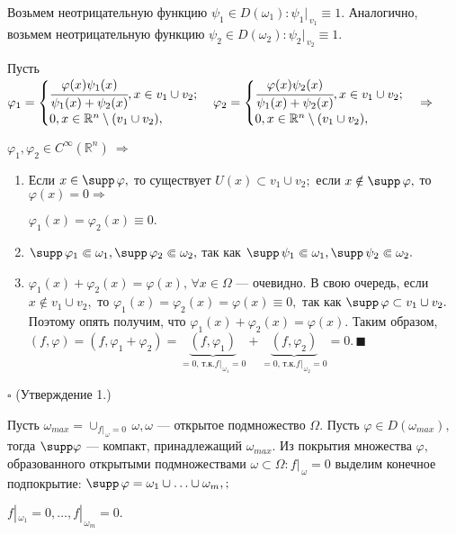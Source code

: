 \documentclass[unicode,12pt,draft]{article}
\begin{document}
Возьмем неотрицательную функцию $\psi_1\in D(\omega_1)\colon
\psi_1|_{\,v_1}\equiv1.$ Аналогично, возьмем неотрицательную
функцию $\psi_2\in D(\omega_2)\colon \psi_2|_{\,v_2}\equiv1.$

Пусть $\varphi_1=\begin{cases} \cfrac{\varphi(x)\psi_1(x)}{\psi_1(x)+\psi_2(x)}, x\in v_1\cup v_2;\\
0, x\in \mathbb R^n\setminus(v_1\cup v_2),\end{cases} \varphi_2=\begin{cases} \cfrac{\varphi(x)\psi_2(x)}{\psi_1(x)+\psi_2(x)}, x\in v_1\cup v_2;\\
0, x\in \mathbb R^n\setminus(v_1\cup v_2),\end{cases} \Rightarrow$

$\varphi_1, \varphi_2 \in C^{\infty}(\mathbb R^n)\ \Rightarrow$
\begin{enumerate}
\item Если $x\in \supp \,\varphi,$ то существует $U(x)\subset v_1\cup
v_2;$ если $x\notin \supp \,\varphi,$ то $\varphi(x)=0
\Rightarrow$

$\varphi_1(x)=\varphi_2(x)\equiv0.$
\item $\supp \,\varphi_1\Subset \omega_1, \supp \,\varphi_2\Subset
\omega_2,$ так как $\supp \,\psi_1\Subset \omega_1, \supp
\,\psi_2\Subset \omega_2.$
\item $\varphi_1(x)+\varphi_2(x)=\varphi(x),\,\forall x\in \Omega$
--- очевидно.
В свою очередь, если $x\notin v_1\cup v_2,$ то
$\varphi_1(x)=\varphi_2(x)=\varphi(x)\equiv0,$ так как $\supp
\,\varphi \subset v_1\cup v_2.$ Поэтому опять получим, что
$\varphi_1(x)+\varphi_2(x)=\varphi(x).$ Таким
образом,$(f,\varphi)=(f,\varphi_1+\varphi_2)=\underbrace{(f,\varphi_1)}_{=0,\,\mbox{т.к.}
 f|_{\,\omega_1}=0}+\underbrace{(f,\varphi_2)}_{=0,\,\mbox{т.к.}
 f|_{\,\omega_2}=0}=0. \,\blacksquare$
\end{enumerate}

$\square$ (Утверждение 1.)

Пусть $\omega_{max}=\cup%
_{f|_{\,\omega}=0}\,\omega, \omega$ --- открытое подмножество
$\Omega.$ Пусть $\varphi\in D(\omega_{max}),$ тогда $\supp
\varphi$
--- компакт, принадлежащий $\omega_{max}.$ Из покрытия множества
$\varphi,$ образованного открытыми подмножествами $\omega \subset
\Omega\colon f|_{\,\omega}=0$ выделим конечное подпокрытие: $\supp
\,\varphi=\omega_1\cup\ldots\cup\omega_m,;$

$f|_{\,\omega_1}=0, \ldots, f|_{\,\omega_m}=0.$
\end{document}
